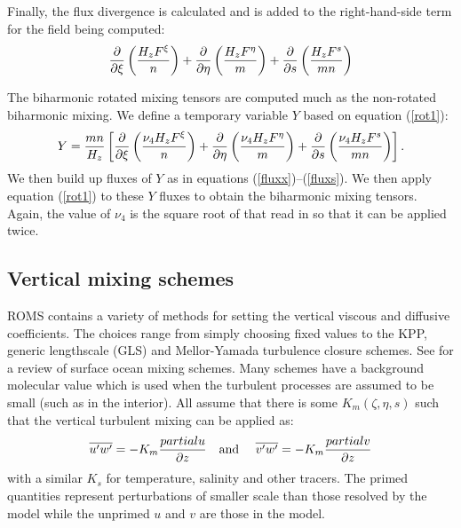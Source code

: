 Finally, the flux divergence is calculated and is added to the
right-hand-side term for the field being computed:
\begin{equation}
  {\partial \over \partial \xi} \left( { H_z F^\xi \over n} \right) +
  {\partial \over \partial \eta} \left( { H_z F^\eta \over m} \right) +
  {\partial \over \partial s}
  \left( { H_z F^s \over mn} \right)
\label{rot1}
\end{equation}

The biharmonic rotated mixing tensors are computed much as the
non-rotated biharmonic mixing.  We define a temporary variable $Y$
based on equation (\ref{rot1}):
\begin{equation}
  Y = {mn \over H_z} \left[
  {\partial \over \partial \xi} \left( {\nu_4 H_z F^\xi \over n} \right) +
  {\partial \over \partial \eta} \left( {\nu_4 H_z F^\eta \over m} \right) +
  {\partial \over \partial s}
  \left( {\nu_4 H_z F^s \over mn} \right)
  \right] .
\end{equation}
We then build up fluxes of $Y$ as in equations
(\ref{fluxx})--(\ref{fluxs}).  We then apply equation (\ref{rot1})
to these $Y$ fluxes to obtain the biharmonic mixing tensors. Again, the
value of $\nu_4$ is the square root of that read in so that it can be
applied twice.

\subsection{Vertical mixing schemes}
\label{Vmix}
ROMS contains a variety of methods for setting the vertical viscous and
diffusive coefficients. The choices range from simply choosing fixed
values to the KPP, generic lengthscale (GLS) and Mellor-Yamada turbulence
closure schemes.  See \cite{Large98} for a review of surface ocean
mixing schemes.  Many schemes have a background molecular value which
is used when the turbulent processes are assumed to be small (such as
in the interior). All assume that there is some $K_m(\zeta,\eta,s)$
such that the vertical turbulent mixing can be applied as:
\begin{equation}
    \overline{u' w'} = -K_m {partial u \over \partial z}
    \mbox{\quad and \quad}
    \overline{v' w'} = -K_m {partial v \over \partial z}
\end{equation}
with a similar $K_s$ for temperature, salinity and other tracers. The
primed quantities represent perturbations of smaller scale than those
resolved by the model while the unprimed $u$ and $v$ are those in
the model.

